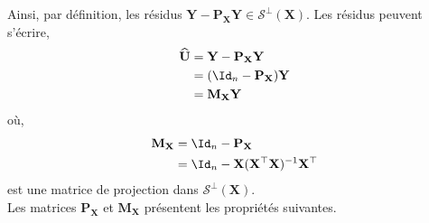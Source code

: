 Ainsi, par définition, les résidus $\mathbf{Y} - \mathbf{P}_\mathbf{X}\mathbf{Y}\in\mathcal{S}^\perp(\mathbf{X})$. Les résidus peuvent s'écrire,
\begin{align*}
\widehat{\mathbf{U}} &= \mathbf{Y}-\mathbf{P}_\mathbf{X}\mathbf{Y} \\
&= (\Id_n - \mathbf{P}_\mathbf{X})\mathbf{Y}\\
& = \mathbf{M}_\mathbf{X}\mathbf{Y}
\end{align*}
où,
\begin{align*}
\mathbf{M}_\mathbf{X} &= \Id_n - \mathbf{P}_\mathbf{X}\\
& = \Id_n - \mathbf{X}(\mathbf{X}^\top\mathbf{X})^{-1}\mathbf{X}^\top
\end{align*}
est une matrice de projection dans $\mathcal{S}^\perp(\mathbf{X})$.\\
Les matrices $\mathbf{P}_\mathbf{X}$ et $\mathbf{M}_\mathbf{X}$ présentent les propriétés suivantes.
